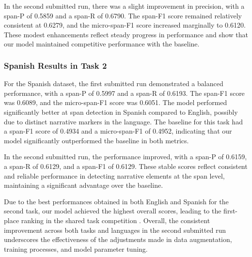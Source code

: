 \documentclass{Configuration_Files/PoliMi3i_thesis}
\begin{document}
In the second submitted run, there was a slight improvement in precision, with a span-P of 0.5859 and a span-R of 0.6790. The span-F1 score remained relatively consistent at 0.6279, and the micro-span-F1 score increased marginally to 0.6120. These modest enhancements reflect steady progress in performance and show that our model maintained competitive performance with the baseline.

\subsubsection{Spanish Results in Task 2} \label{subsubsec:es_res_T2}
For the Spanish dataset, the first submitted run demonstrated a balanced performance, with a span-P of 0.5997 and a span-R of 0.6193. The span-F1 score was 0.6089, and the micro-span-F1 score was 0.6051. The model performed significantly better at span detection in Spanish compared to English, possibly due to distinct narrative markers in the language. The baseline for this task had a span-F1 score of 0.4934 and a micro-span-F1 of 0.4952, indicating that our model significantly outperformed the baseline in both metrics.

In the second submitted run, the performance improved, with a span-P of 0.6159, a span-R of 0.6129, and a span-F1 of 0.6129. These stable scores reflect consistent and reliable performance in detecting narrative elements at the span level, maintaining a significant advantage over the baseline.

Due to the best performances obtained in both English and Spanish for the second task, our model achieved the highest overall scores, leading to the first-place ranking in the shared task competition \cite{tulbure2024conspiracy}. Overall, the consistent improvement across both tasks and languages in the second submitted run underscores the effectiveness of the adjustments made in data augmentation, training processes, and model parameter tuning. %
\end{document}
